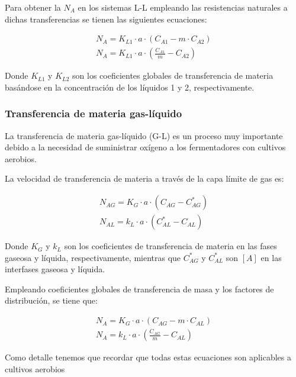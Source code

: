 \documentclass{AsignaturaResumen}
\begin{document}
Para obtener la $N_{A}$ en los sistemas L-L empleando las resistencias naturales a dichas transferencias se tienen las siguientes ecuaciones:

\begin{gather}
    N_{A} = K_{L1} \cdot a \cdot (C_{A1} - m \cdot C_{A2})
    \\
    N_{A} = K_{L1} \cdot a \cdot \left(\frac{C_{A1}}{m} - C_{A2}\right)
\end{gather}

Donde $K_{L1}$ y $K_{L2}$ son los coeficientes globales de transferencia de materia basándose en la concentración de los líquidos 1 y 2, respectivamente.

\subsubsection{Transferencia de materia gas-líquido}

La transferencia de materia gas-líquido (G-L) es un proceso muy importante debido a la necesidad de suministrar oxígeno a los fermentadores con cultivos aerobios.

La velocidad de transferencia de materia a través de la capa límite de gas es\footnotemark:


\begin{gather}
    N_{AG} = K_{G} \cdot a \cdot (C_{AG} - C_{AG}^{\ast})
    \\
    N_{AL} = k_{L} \cdot a \cdot (C_{AL}^{\ast} - C_{AL})
\end{gather}

Donde $K_{G}$ y $k_{L}$ son los coeficientes de transferencia de materia en las fases gaseosa y líquida, respectivamente, mientras que $C_{AG}^{\ast}$ y $C_{AL}^{\ast}$ son $[A]$ en las interfases gaseosa y líquida.

Empleando coeficientes globales de transferencia de masa y los factores de distribución, se tiene que:

\begin{gather}
    N_{A} = K_{G} \cdot a \cdot (C_{AG} - m \cdot C_{AL})
    \\
    N_{A} = k_{L} \cdot a \cdot \left(\frac{C_{AG}}{m} - C_{AL}\right)
\end{gather}

Como detalle tenemos que recordar que todas estas ecuaciones son aplicables a cultivos aerobios
\end{document}
